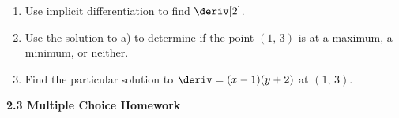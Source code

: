 \begin{enumerate}[label=\hspace{11pt}(\alph*), align=left, leftmargin=*, labelsep=0.25em]
    \item Use implicit differentiation to find $\deriv[2]$.
    \item Use the solution to a) to determine if the point $(1, \, 3)$ is at a maximum, a minimum, or neither.
    \item Find the particular solution to $\deriv = (x - 1)(y + 2)$ at $(1, \, 3)$.
\end{enumerate} \vspace{11pt}

\textbf{\large{2.3 Multiple Choice Homework}} \par

